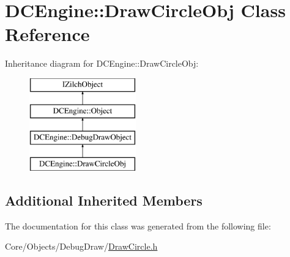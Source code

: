 \hypertarget{classDCEngine_1_1DrawCircleObj}{\section{D\-C\-Engine\-:\-:Draw\-Circle\-Obj Class Reference}
\label{classDCEngine_1_1DrawCircleObj}
}
Inheritance diagram for D\-C\-Engine\-:\-:Draw\-Circle\-Obj\-:\begin{figure}[H]
\begin{center}
\leavevmode
\includegraphics[height=4.000000cm]{classDCEngine_1_1DrawCircleObj}
\end{center}
\end{figure}
\subsection*{Additional Inherited Members}


The documentation for this class was generated from the following file\-:\begin{DoxyCompactItemize}
\item 
Core/\-Objects/\-Debug\-Draw/\hyperlink{DrawCircle_8h}{Draw\-Circle.\-h}\end{DoxyCompactItemize}
